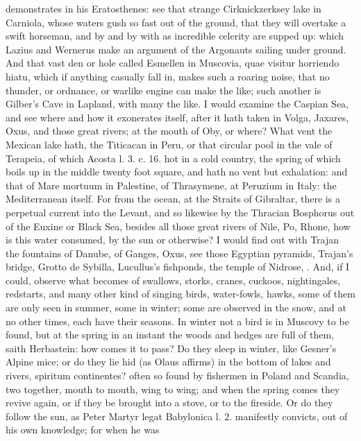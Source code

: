{demonstrates in his Eratosthenes: see that strange
Cirknickzerksey lake in Carniola, whose waters gush so fast out
of the ground, that they will overtake a swift horseman, and by and by
with as incredible celerity are supped up: which Lazius and Wernerus
make an argument of the Argonauts sailing under ground. And that vast
den or hole called Esmellen in Muscovia, quae visitur horriendo
hiatu, \etc{} which if anything casually fall in, makes such a roaring
noise, that no thunder, or ordnance, or warlike engine can make the
like; such another is Gilber's Cave in Lapland, with many the like. I
would examine the Caspian Sea, and see where and how it exonerates
itself, after it hath taken in Volga, Jaxares, Oxus, and those great
rivers; at the mouth of Oby, or where? What vent the Mexican lake hath,
the Titicacan in Peru, or that circular pool in the vale of Terapeia,
of which Acosta l. 3. c. 16. hot in a cold country, the spring of which
boils up in the middle twenty foot square, and hath no vent but
exhalation: and that of Mare mortuum in Palestine, of Thrasymene, at
Peruzium in Italy: the Mediterranean itself. For from the ocean, at the
Straits of Gibraltar, there is a perpetual current into the Levant, and
so likewise by the Thracian Bosphorus out of the Euxine or Black Sea,
besides all those great rivers of Nile, Po, Rhone, \etc{} how is this
water consumed, by the sun or otherwise? I would find out with Trajan
the fountains of Danube, of Ganges, Oxus, see those Egyptian pyramids,
Trajan's bridge, Grotto de Sybilla, Lucullus's fishponds, the temple of
Nidrose, \etc. And, if I could, observe what becomes of swallows,
storks, cranes, cuckoos, nightingales, redstarts, and many other kind
of singing birds, water-fowls, hawks, \etc{} some of them are only seen in
summer, some in winter; some are observed in the snow, and at no
other times, each have their seasons. In winter not a bird is in
Muscovy to be found, but at the spring in an instant the woods and
hedges are full of them, saith Herbastein: how comes it to pass?
Do they sleep in winter, like Gesner's Alpine mice; or do they lie hid
(as Olaus affirms) in the bottom of lakes and rivers, spiritum
continentes? often so found by fishermen in Poland and Scandia, two
together, mouth to mouth, wing to wing; and when the spring comes they
revive again, or if they be brought into a stove, or to the fireside.
Or do they follow the sun, as Peter Martyr legat Babylonica l. 2.
manifestly convicts, out of his own knowledge; for when he was
}
